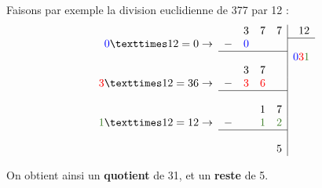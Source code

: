 \documentclass[../€Cours-complet/Cours-complet]{subfiles}
\begin{document}
\begin{exemple}
	Faisons par exemple la division euclidienne de 377 par 12 :
	$$
		\begin{array}{rrrrr|r}
			                                        &   & 3                   & 7                         & 7                         & 12                                                             \\
			\cline{6-6}
			\textcolor{blue}{0} × 12 = 0 \to        & - & \textcolor{blue}{0} &                           &                           &                                                                \\
			\cline{2-5}
			                                        &   &                     &                           &                           & \textcolor{blue}{0}\textcolor{red}{3}\textcolor{OliveGreen}{1} \\
			                                        &   & 3                   & 7                         &                           &                                                                \\
			\textcolor{red}{3} × 12 = 36 \to        & - & \textcolor{red}{3}  & \textcolor{red}{6}        &                           &                                                                \\
			\cline{2-5}
			                                        &   &                     &                           &                           &                                                                \\
			                                        &   &                     & 1                         & 7                         &                                                                \\
			\textcolor{OliveGreen}{1} × 12 = 12 \to & - &                     & \textcolor{OliveGreen}{1} & \textcolor{OliveGreen}{2} &                                                                \\
			\cline{2-5}
			                                        &   &                     &                           &                           &                                                                \\
			                                        &   &                     &                           & 5                         &
		\end{array}
	$$

	On obtient ainsi un \textbf{quotient} de 31, et un \textbf{reste} de 5.
\end{exemple}
\end{document}
